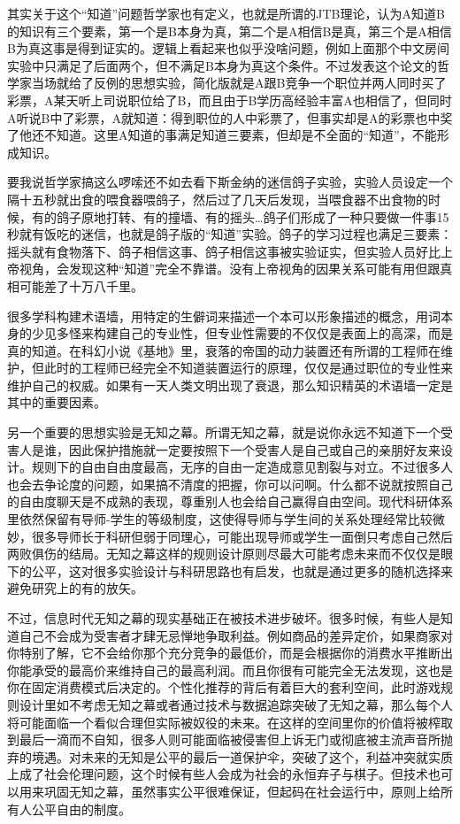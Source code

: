 \documentclass[]{tufte-book}
\begin{document}
其实关于这个``知道''问题哲学家也有定义，也就是所谓的JTB理论，认为A知道B的知识有三个要素，第一个是B本身为真，第二个是A相信B是真，第三个是A相信B为真这事是得到证实的。逻辑上看起来也似乎没啥问题，例如上面那个中文房间实验中只满足了后面两个，但不满足B本身为真这个条件。不过发表这个论文的哲学家当场就给了反例的思想实验，简化版就是A跟B竞争一个职位并两人同时买了彩票，A某天听上司说职位给了B，而且由于B学历高经验丰富A也相信了，但同时A听说B中了彩票，A就知道：得到职位的人中彩票了，但事实却是A的彩票也中奖了他还不知道。这里A知道的事满足知道三要素，但却是不全面的``知道''，不能形成知识。

要我说哲学家搞这么啰嗦还不如去看下斯金纳的迷信鸽子实验，实验人员设定一个隔十五秒就出食的喂食器喂鸽子，然后过了几天后发现，当喂食器不出食物的时候，有的鸽子原地打转、有的撞墙、有的摇头\ldots 鸽子们形成了一种只要做一件事15秒就有饭吃的迷信，也就是鸽子版的``知道''实验。鸽子的学习过程也满足三要素：摇头就有食物落下、鸽子相信这事、鸽子相信这事被实验证实，但实验人员好比上帝视角，会发现这种``知道''完全不靠谱。没有上帝视角的因果关系可能有用但跟真相可能差了十万八千里。

很多学科构建术语墙，用特定的生僻词来描述一个本可以形象描述的概念，用词本身的少见多怪来构建自己的专业性，但专业性需要的不仅仅是表面上的高深，而是真的知道。在科幻小说《基地》里，衰落的帝国的动力装置还有所谓的工程师在维护，但此时的工程师已经完全不知道装置运行的原理，仅仅是通过职位的专业性来维护自己的权威。如果有一天人类文明出现了衰退，那么知识精英的术语墙一定是其中的重要因素。

另一个重要的思想实验是无知之幕。所谓无知之幕，就是说你永远不知道下一个受害人是谁，因此保护措施就一定要按照下一个受害人是自己或自己的亲朋好友来设计。规则下的自由自由度最高，无序的自由一定造成意见割裂与对立。不过很多人也会去争论度的问题，如果搞不清度的把握，你可以问啊。什么都不说就按照自己的自由度聊天是不成熟的表现，尊重别人也会给自己赢得自由空间。现代科研体系里依然保留有导师-学生的等级制度，这使得导师与学生间的关系处理经常比较微妙，很多导师长于科研但弱于同理心，可能出现导师或学生一面倒只考虑自己然后两败俱伤的结局。无知之幕这样的规则设计原则尽最大可能考虑未来而不仅仅是眼下的公平，这对很多实验设计与科研思路也有启发，也就是通过更多的随机选择来避免研究上的有的放矢。

不过，信息时代无知之幕的现实基础正在被技术进步破坏。很多时候，有些人是知道自己不会成为受害者才肆无忌惮地争取利益。例如商品的差异定价，如果商家对你特别了解，它不会给你那个充分竞争的最低价，而是会根据你的消费水平推断出你能承受的最高价来维持自己的最高利润。而且你很有可能完全无法发现，这也是你在固定消费模式后决定的。个性化推荐的背后有着巨大的套利空间，此时游戏规则设计里如不考虑无知之幕或者通过技术与数据追踪突破了无知之幕，那么每个人将可能面临一个看似合理但实际被奴役的未来。在这样的空间里你的价值将被榨取到最后一滴而不自知，很多人则可能面临被侵害但上诉无门或彻底被主流声音所抛弃的境遇。对未来的无知是公平的最后一道保护伞，突破了这个，利益冲突就实质上成了社会伦理问题，这个时候有些人会成为社会的永恒弃子与棋子。但技术也可以用来巩固无知之幕，虽然事实公平很难保证，但起码在社会运行中，原则上给所有人公平自由的制度。
\end{document}
